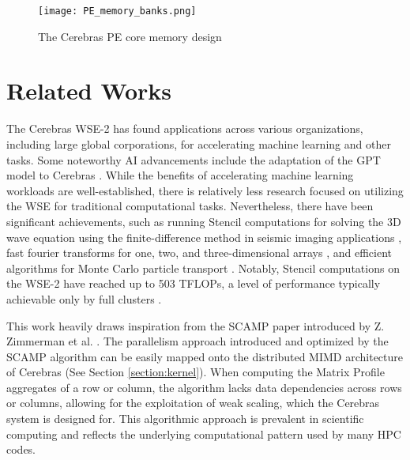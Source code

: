 \begin{figure}[h!]
    \texttt{[image: PE\_memory\_banks.png]}
    \centering
    \caption{The Cerebras PE core memory design \cite{12}}
    \label{fig:pe_memory}
\end{figure}

\section{Related Works} \label{section:related_works}

The Cerebras WSE-2 has found applications across various organizations, including large global corporations, for accelerating machine learning and other tasks. Some noteworthy AI advancements include the adaptation of the GPT model to Cerebras \cite{3}. While the benefits of accelerating machine learning workloads are well-established, there is relatively less research focused on utilizing the WSE for traditional computational tasks. Nevertheless, there have been significant achievements, such as running Stencil computations for solving the 3D wave equation using the finite-difference method in seismic imaging applications \cite{5}, fast fourier transforms for one, two, and three-dimensional arrays \cite{6}, and efficient algorithms for Monte Carlo particle transport \cite{7}. Notably, Stencil computations on the WSE-2 have reached up to 503 TFLOPs, a level of performance typically achievable only by full clusters \cite{8}.

This work heavily draws inspiration from the SCAMP paper introduced by Z. Zimmerman et al. \cite{4}. The parallelism approach introduced and optimized by the SCAMP algorithm can be easily mapped onto the distributed MIMD architecture of Cerebras (See Section \ref{section:kernel}). When computing the Matrix Profile aggregates of a row or column, the algorithm lacks data dependencies across rows or columns, allowing for the exploitation of weak scaling, which the Cerebras system is designed for. This algorithmic approach is prevalent in scientific computing and reflects the underlying computational pattern used by many HPC codes.